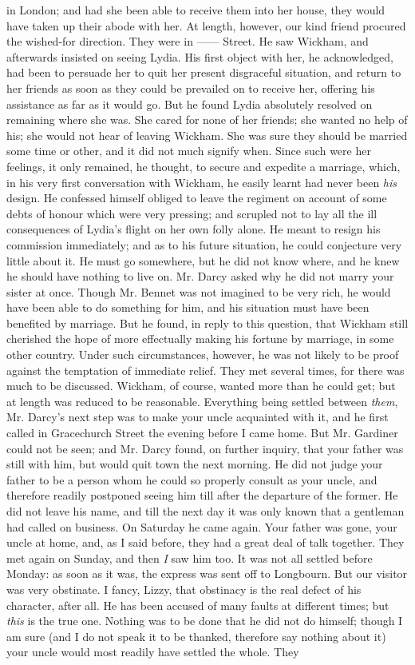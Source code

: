 in London; and had she been able to receive them into her house, they would have taken up their abode with her. At length, however, our kind friend procured the wished-for direction. They were in ------ Street. He saw Wickham, and afterwards insisted on seeing Lydia. His first object with her, he acknowledged, had been to persuade her to quit her present disgraceful situation, and return to her friends as soon as they could be prevailed on to receive her, offering his assistance as far as it would go. But he found Lydia absolutely resolved on remaining where she was. She cared for none of her friends; she wanted no help of his; she would not hear of leaving Wickham. She was sure they should be married some time or other, and it did not much signify when. Since such were her feelings, it only remained, he thought, to secure and expedite a marriage, which, in his very first conversation with Wickham, he easily learnt had never been \textit{his} design. He confessed himself obliged to leave the regiment on account of some debts of honour which were very pressing; and scrupled not to lay all the ill consequences of Lydia's flight on her own folly alone. He meant to resign his commission immediately; and as to his future situation, he could conjecture very little about it. He must go somewhere, but he did not know where, and he knew he should have nothing to live on. Mr. Darcy asked why he did not marry your sister at once. Though Mr. Bennet was not imagined to be very rich, he would have been able to do something for him, and his situation must have been benefited by marriage. But he found, in reply to this question, that Wickham still cherished the hope of more effectually making his fortune by marriage, in some other country. Under such circumstances, however, he was not likely to be proof against the temptation of immediate relief. They met several times, for there was much to be discussed. Wickham, of course, wanted more than he could get; but at length was reduced to be reasonable. Everything being settled between \textit{them}, Mr. Darcy's next step was to make your uncle acquainted with it, and he first called in Gracechurch Street the evening before I came home. But Mr. Gardiner could not be seen; and Mr. Darcy found, on further inquiry, that your father was still with him, but would quit town the next morning. He did not judge your father to be a person whom he could so properly consult as your uncle, and therefore readily postponed seeing him till after the departure of the former. He did not leave his name, and till the next day it was only known that a gentleman had called on business. On Saturday he came again. Your father was gone, your uncle at home, and, as I said before, they had a great deal of talk together. They met again on Sunday, and then \textit{I} saw him too. It was not all settled before Monday: as soon as it was, the express was sent off to Longbourn. But our visitor was very obstinate. I fancy, Lizzy, that obstinacy is the real defect of his character, after all. He has been accused of many faults at different times; but \textit{this} is the true one. Nothing was to be done that he did not do himself; though I am sure (and I do not speak it to be thanked, therefore say nothing about it) your uncle would most readily have settled the whole. They 